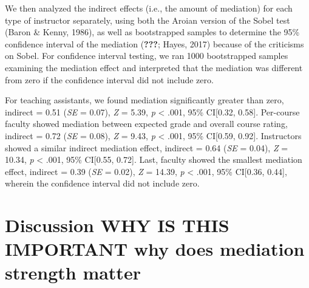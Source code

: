 \documentclass[man]{apa6}
\theoremstyle{definition}
\theoremstyle{definition}
\theoremstyle{definition}
\theoremstyle{remark}
\begin{document}
We then analyzed the indirect effects (i.e., the amount of mediation)
for each type of instructor separately, using both the Aroian version of
the Sobel test (Baron \& Kenny, 1986), as well as bootstrapped samples
to determine the 95\% confidence interval of the mediation
({\textbf{???}}; Hayes, 2017) because of the criticisms on Sobel. For
confidence interval testing, we ran 1000 bootstrapped samples examining
the mediation effect and interpreted that the mediation was different
from zero if the confidence interval did not include zero.

For teaching assistants, we found mediation significantly greater than
zero, indirect = 0.51 (\emph{SE} = 0.07), \emph{Z} = 5.39, \emph{p}
\textless{} .001, 95\% CI{[}0.32, 0.58{]}. Per-course faculty showed
mediation between expected grade and overall course rating, indirect =
0.72 (\emph{SE} = 0.08), \emph{Z} = 9.43, \emph{p} \textless{} .001,
95\% CI{[}0.59, 0.92{]}. Instructors showed a similar indirect mediation
effect, indirect = 0.64 (\emph{SE} = 0.04), \emph{Z} = 10.34, \emph{p}
\textless{} .001, 95\% CI{[}0.55, 0.72{]}. Last, faculty showed the
smallest mediation effect, indirect = 0.39 (\emph{SE} = 0.02), \emph{Z}
= 14.39, \emph{p} \textless{} .001, 95\% CI{[}0.36, 0.44{]}, wherein the
confidence interval did not include zero.

\section{Discussion WHY IS THIS IMPORTANT why does mediation strength
matter}\label{discussion-why-is-this-important-why-does-mediation-strength-matter}
\end{document}
